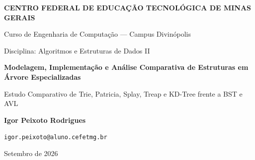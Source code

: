 \documentclass[11pt,a4paper]{article}
\begin{document}
\begin{center}
  {\large\textbf{\MakeUppercase{Centro Federal de Educação Tecnológica de Minas Gerais}}\par}
  \vspace{0.1cm}
  {\normalsize Curso de Engenharia de Computação --- Campus Divinópolis\par}
  {\small Disciplina: Algoritmos e Estruturas de Dados II\par}
  \vspace{0.35cm}
  {\Large\textbf{Modelagem, Implementação e Análise Comparativa de Estruturas em Árvore Especializadas}\par}
  \vspace{0.15cm}
  {\large Estudo Comparativo de Trie, Patricia, Splay, Treap e KD-Tree frente a BST e AVL\par}
  \vspace{0.25cm}
  {\normalsize\textbf{Igor Peixoto Rodrigues}\par}
  {\small\texttt{igor.peixoto@aluno.cefetmg.br}\par}
  \vspace{0.15cm}
  {\small Setembro de 2026\par}
\end{center}

\vspace{0.08cm}

\begin{abstract}
Este relatório técnico apresenta um estudo teórico, algorítmico e comparativo de cinco estruturas de dados hierárquicas avançadas: Árvore Trie, Árvore Patricia (Radix Tree compactada), Árvore Splay, Árvore Treap e Árvore k-Dimensional (KD-Tree), estabelecendo contrapontos diretos com Árvores Binárias de Busca (BST) e Árvores AVL. O trabalho articula fundamentação conceitual, invariantes estruturais, anatomia de nós, decisões de implementação em C++, demonstrações e rastreamentos visuais de transformações topológicas, análise formal de complexidade assintótica e avaliação experimental de desempenho. As estruturas especializadas respondem a limitações fundamentais dos modelos clássicos: Trie e Patricia decompõem chaves em fragmentos para buscas por prefixo em tempo independente do número de elementos; Splay explora a localidade temporal via autoajuste amortizado; Treap assegura balanceamento probabilístico via números pseudoaleatórios independentemente da ordem de inserção; e KD-Tree decompõe espaços multidimensionais para consultas espaciais de vizinhança. A análise integrada evidencia que a seleção adequada é estritamente condicionada ao domínio das chaves, ao perfil temporal das operações e à tolerância a variações de latência.

\vspace{0.15cm}
\noindent\textbf{Palavras-chave:} Estruturas de Dados Avançadas; Árvores de Prefixos; Autoajuste; Balanceamento Probabilístico; Particionamento Multidimensional; Complexidade Algorítmica.
\end{abstract}
\end{document}
